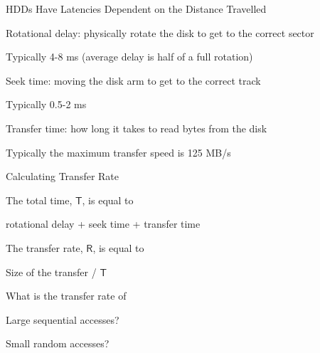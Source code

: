   \begin{frame}{HDDs Have Latencies Dependent on the Distance Travelled}

    Rotational delay: physically rotate the disk to get to the correct sector

    \hspace{2em} Typically 4-8 ms (average delay is half of a full rotation)

    \vspace{2em}

    Seek time: moving the disk arm to get to the correct track

    \hspace{2em} Typically 0.5-2 ms

    \vspace{2em}

    Transfer time: how long it takes to read bytes from the disk

    \hspace{2em} Typically the maximum transfer speed is 125 MB/s
  \end{frame}

  \begin{frame}{Calculating Transfer Rate}

    The total time, $\mathsf{T}$, is equal to

    \hspace{2em} rotational delay + seek time + transfer time

    \vspace{2em}

    The transfer rate, $\mathsf{R}$, is equal to

    \hspace{2em} Size of the transfer / $\mathsf{T}$

    \vspace{2em}

    What is the transfer rate of

    \hspace{2em} Large sequential accesses?

    \hspace{2em} Small random accesses?
  \end{frame}

